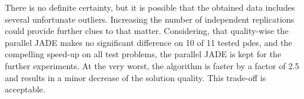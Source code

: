 \documentclass[./\jobname.tex]{subfiles}
\begin{document}
\begin{figure}[H]
	\centering
	\noindent{}
	\label{fig:pde4_ex0_ex1_boxplot}
\end{figure}

There is no definite certainty, but it is possible that the obtained data includes several unfortunate outliers. Increasing the number of independent replications could provide further clues to that matter. Considering, that quality-wise the parallel JADE makes no significant difference on 10 of 11 tested \gls{pde}s, and the compelling speed-up on all test problems, the parallel JADE is kept for the further experiments. At the very worst, the algorithm is faster by a factor of 2.5 and results in a minor decrease of the solution quality. This trade-off is acceptable.
\end{document}
